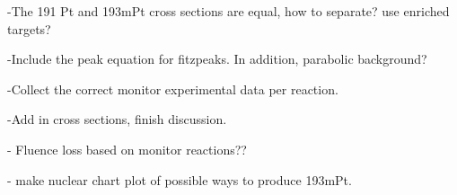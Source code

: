 -The 191 Pt and 193mPt cross sections are equal, how to separate? use enriched targets? 

-Include the peak equation for fitzpeaks. In addition, parabolic background? 

-Collect the correct monitor experimental data per reaction. 

-Add in cross sections, finish discussion. 

- Fluence loss based on monitor reactions?? 

- make nuclear chart plot of possible ways to produce 193mPt. 